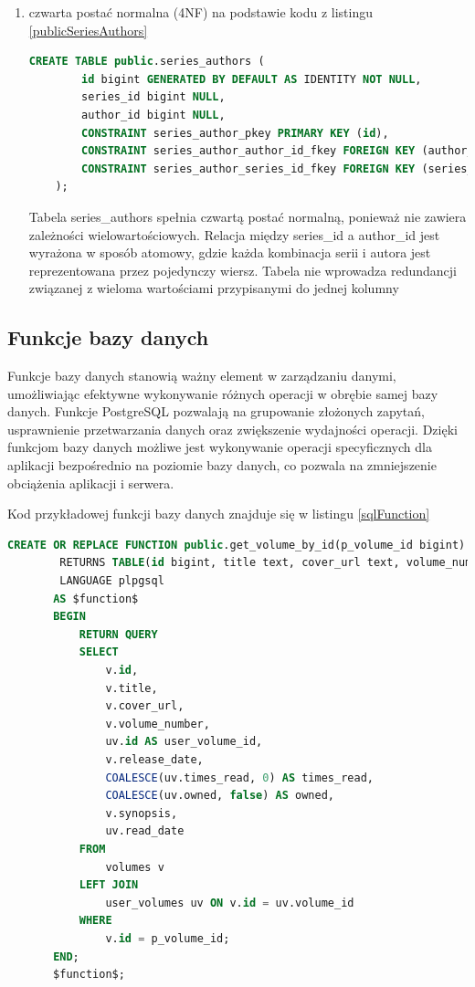 \documentclass[12pt,twoside]{article}
\begin{document}
\begin{enumerate}[label=\alph*), leftmargin=1.25cm]
	\item czwarta postać normalna (4NF) na podstawie kodu z listingu \ref{publicSeriesAuthors}
	\begin{lstlisting}[language=SQL,caption=kod tworzenia tabeli series\_authors, label={publicSeriesAuthors}]
		CREATE TABLE public.series_authors (
		id bigint GENERATED BY DEFAULT AS IDENTITY NOT NULL,
		series_id bigint NULL,
		author_id bigint NULL,
		CONSTRAINT series_author_pkey PRIMARY KEY (id),
		CONSTRAINT series_author_author_id_fkey FOREIGN KEY (author_id) REFERENCES authors(id) ON UPDATE CASCADE ON DELETE CASCADE,
		CONSTRAINT series_author_series_id_fkey FOREIGN KEY (series_id) REFERENCES series(id) ON UPDATE CASCADE ON DELETE CASCADE
	);
	\end{lstlisting}
	Tabela series\_authors spełnia czwartą postać normalną, ponieważ nie zawiera zależności wielowartościowych. Relacja 
	między series\_id a author\_id jest wyrażona w sposób atomowy, gdzie każda kombinacja serii i autora jest 
	reprezentowana przez pojedynczy wiersz. Tabela nie wprowadza redundancji związanej z wieloma wartościami 
	przypisanymi do jednej kolumny
\end{enumerate}


\subsection{Funkcje bazy danych}

Funkcje bazy danych stanowią ważny element w zarządzaniu danymi, umożliwiając efektywne wykonywanie różnych operacji 
w obrębie samej bazy danych. Funkcje PostgreSQL pozwalają na grupowanie złożonych zapytań, usprawnienie przetwarzania 
danych oraz zwiększenie wydajności operacji. Dzięki funkcjom bazy danych możliwe jest wykonywanie operacji 
specyficznych dla aplikacji bezpośrednio na poziomie bazy danych, co pozwala na zmniejszenie obciążenia aplikacji i 
serwera.

Kod przykładowej funkcji bazy danych znajduje się w listingu \ref{sqlFunction}

	\begin{lstlisting}[language=SQL,caption=kod funkcji get\_volume\_by\_id, label={sqlFunction}]
		CREATE OR REPLACE FUNCTION public.get_volume_by_id(p_volume_id bigint)
		RETURNS TABLE(id bigint, title text, cover_url text, volume_number smallint, user_volume_id bigint, release_date timestamp with time zone, times_read smallint, owned boolean, synopsis text, read_date timestamp with time zone)
		LANGUAGE plpgsql
	   AS $function$
	   BEGIN
		   RETURN QUERY
		   SELECT 
			   v.id,
			   v.title,
			   v.cover_url,
			   v.volume_number,
			   uv.id AS user_volume_id,
			   v.release_date,
			   COALESCE(uv.times_read, 0) AS times_read,
			   COALESCE(uv.owned, false) AS owned,
			   v.synopsis,
			   uv.read_date
		   FROM 
			   volumes v
		   LEFT JOIN 
			   user_volumes uv ON v.id = uv.volume_id
		   WHERE 
			   v.id = p_volume_id;
	   END;
	   $function$;
	\end{lstlisting}
\end{document}
